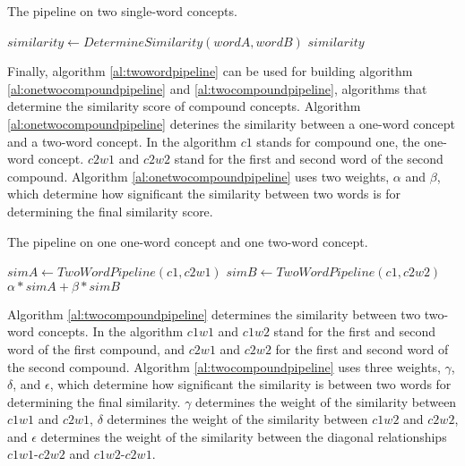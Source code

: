 \documentclass{article}
\begin{document}
\begin{algorithm}
\caption{The pipeline on two single-word concepts.}\label{al:twowordpipeline}
\begin{algorithmic}[1]
		\State $\textit{similarity} \gets \textit{DetermineSimilarity}(wordA, wordB)$
				\State {}
			\EndIf
		\EndIf
		\State \Return $\textit{similarity}$
	\EndProcedure
\end{algorithmic}
\end{algorithm}

Finally, algorithm \ref{al:twowordpipeline} can be used for building algorithm \ref{al:onetwocompoundpipeline} and \ref{al:twocompoundpipeline}, algorithms that determine the similarity score of compound concepts. Algorithm \ref{al:onetwocompoundpipeline} deterines the similarity between a one-word concept and a two-word concept. In the algorithm $c1$ stands for compound one, the one-word concept. $c2w1$ and $c2w2$ stand for the first and second word of the second compound. Algorithm \ref{al:onetwocompoundpipeline} uses two weights, $\alpha$ and $\beta$, which determine how significant the similarity between two words is for determining the final similarity score.

\begin{algorithm}
\caption{The pipeline on one one-word concept and one two-word concept.}\label{al:onetwocompoundpipeline}
\begin{algorithmic}[1]
		\State $\textit{simA} \gets \textit{TwoWordPipeline}(c1, c2w1)$
		\State $\textit{simB} \gets \textit{TwoWordPipeline}(c1, c2w2)$
		\State \Return $\alpha * \textit{simA} + \beta * \textit{simB}$
	\EndProcedure
\end{algorithmic}
\end{algorithm}

Algorithm \ref{al:twocompoundpipeline} determines the similarity between two two-word concepts. In the algorithm $c1w1$ and $c1w2$ stand for the first and second word of the first compound, and $c2w1$ and $c2w2$ for the first and second word of the second compound. Algorithm \ref{al:twocompoundpipeline} uses three weights, $\gamma$, $\delta$, and $\epsilon$, which determine how significant the similarity is between two words for determining the final similarity. $\gamma$ determines the weight of the similarity between $c1w1$ and $c2w1$, $\delta$ determines the weight of the similarity between $c1w2$ and $c2w2$, and $\epsilon$ determines the weight of the similarity between the diagonal relationships $c1w1$-$c2w2$ and $c1w2$-$c2w1$.
\end{document}
